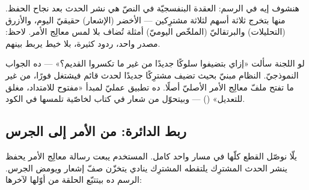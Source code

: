 هنشوف إيه في الرسم: العقدة البنفسجيّة في النصّ هي نشر الحدث بعد نجاح الحفظ.
منها بتخرج ثلاثة أسهم لثلاثة مشترِكين — الأخضر (الإشعار) حقيقيّ اليوم، والأزرق
(التحليلات) والبرتقاليّ (الملخّص اليوميّ) أمثلة تُضاف بلا لمس معالِج الأمر. لاحظ:
مصدر واحد، ردود كثيرة، بلا خيط يربط بينهم.

\begin{spotlight}
لو اللجنة سألت «إزاي بتضيفوا سلوكًا جديدًا من غير ما تكسروا القديم؟» — ده الجواب
النموذجيّ. النظام مبنيّ بحيث تضيف مشترِكًا جديدًا لحدث قائم فيشتغل فورًا، من
غير ما تفتح ملفّ معالِج الأمر الأصليّ أصلًا. ده تطبيق عمليّ لمبدأ «مفتوح للامتداد،
مغلق للتعديل» () — وبيتحوّل من شعار في كتاب لخاصّية تلمسها في الكود.
\end{spotlight}

\subsection{ربط الدائرة: من الأمر إلى الجرس}

يلّا نوصّل القطع كلّها في مسار واحد كامل. المستخدم يبعت رسالة \en{$\rightarrow$}
معالِج الأمر يحفظ \en{$\rightarrow$} ينشر الحدث \en{$\rightarrow$} المشترِك يلتقطه
\en{$\rightarrow$} المشترِك ينادي  \en{$\rightarrow$} يتخزّن صفّ
إشعار ويومض الجرس. الرسم ده بيتتبّع الحلقة من أوّلها لآخرها:

\begin{center}\begin{LTR}
\end{LTR}\end{center}

